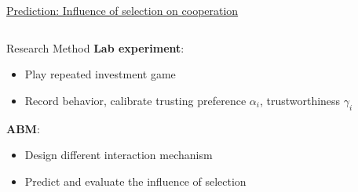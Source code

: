 \documentclass[compress]{beamer}
\begin{document}
\begin{frame}{\href{https://www.sciencedirect.com/science/article/pii/S0378873312000202}{Prediction: Influence of selection on cooperation\cite{bravo2012trust}}}
\begin{columns}[c]
\begin{column}{.5\textwidth}
\begin{minipage}{5.8cm}
                \begin{block}{Research Method}
                    \textbf{Lab experiment}:\\
                    \begin{itemize}
                        \item Play repeated investment game
                        \item Record behavior, calibrate trusting preference $ \alpha_{i} $, trustworthiness $ \gamma_{i} $
                    \end{itemize}
                    \textbf{ABM}:
                    \begin{itemize}
                        \item Design different interaction mechanism
                        \item Predict and evaluate the influence of selection
                    \end{itemize}
                \end{block}
            \end{minipage}
        \end{column}
    \end{columns}
\end{frame}
\end{document}
